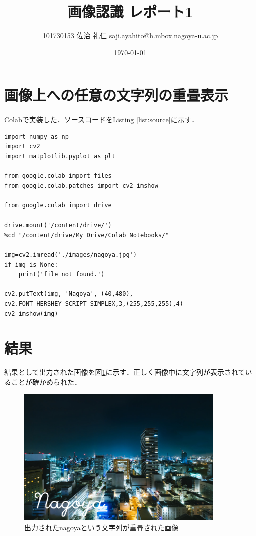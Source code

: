 \documentclass[uplatex]{jsarticle}
\title{画像認識 レポート1}
\author{101730153 佐治 礼仁 saji.ayahito@h.mbox.nagoya-u.ac.jp}
\date{\today}
\begin{document}
\maketitle
\section{画像上への任意の文字列の重畳表示}
Colabで実装した．ソースコードをListing \ref{list:source}に示す．
\begin{lstlisting}[caption=画像への文字列の重畳処理,label=list:source]
import numpy as np
import cv2
import matplotlib.pyplot as plt

from google.colab import files
from google.colab.patches import cv2_imshow

from google.colab import drive

drive.mount('/content/drive/')
%cd "/content/drive/My Drive/Colab Notebooks/"

img=cv2.imread('./images/nagoya.jpg')
if img is None:
    print('file not found.')

cv2.putText(img, 'Nagoya', (40,480), cv2.FONT_HERSHEY_SCRIPT_SIMPLEX,3,(255,255,255),4)
cv2_imshow(img)
\end{lstlisting}
\section{結果}
結果として出力された画像を図\ref{fig:result}に示す．正しく画像中に文字列が表示されていることが確かめられた．
\begin{figure}[htbp]
  \begin{center}
    \includegraphics[clip,width=10.0cm]{figures/image2.png}
    \caption{出力されたnagoyaという文字列が重畳された画像}
    \label{fig:result}
  \end{center}
\end{figure}
\end{document}
